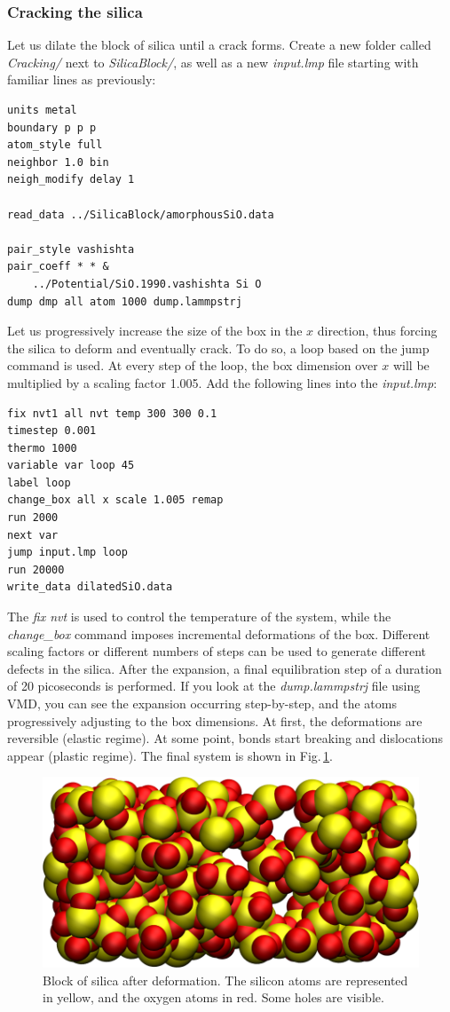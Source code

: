 \documentclass[9pt,tutorial]{livecoms}
\begin{document}
\subsubsection{Cracking the silica}
Let us dilate the block of silica until a crack forms. Create a new folder
called \textit{Cracking/} next to \textit{SilicaBlock/}, as well as a new
\textit{input.lmp} file starting with familiar lines as previously:
{\normalsize \begin{verbatim}
units metal
boundary p p p
atom_style full
neighbor 1.0 bin
neigh_modify delay 1

read_data ../SilicaBlock/amorphousSiO.data

pair_style vashishta
pair_coeff * * &
    ../Potential/SiO.1990.vashishta Si O
dump dmp all atom 1000 dump.lammpstrj
\end{verbatim}}
Let us progressively increase the size of the box in the $x$ direction, thus forcing
the silica to deform and eventually crack. To do so, a loop based on the jump command
is used. At every step of the loop, the box dimension over $x$ will be multiplied
by a scaling factor 1.005. Add the following lines into the \textit{input.lmp}:
{\normalsize \begin{verbatim}
fix nvt1 all nvt temp 300 300 0.1
timestep 0.001
thermo 1000
variable var loop 45
label loop
change_box all x scale 1.005 remap
run 2000
next var
jump input.lmp loop
run 20000
write_data dilatedSiO.data
\end{verbatim}}
The \textit{fix nvt} is used to control the temperature of the system, while the
\textit{change\_box} command imposes incremental deformations of the box. Different
scaling factors or different numbers of steps can be used to generate different
defects in the silica. After the expansion, a final equilibration step of a duration
of 20 picoseconds is performed. If you look at the \textit{dump.lammpstrj} file
using VMD, you can see the expansion occurring step-by-step, and the atoms
progressively adjusting to the box dimensions. At first, the deformations are
reversible (elastic regime). At some point, bonds start breaking and dislocations
appear (plastic regime). The final system is shown in Fig.\,\ref{fig:GCMC-cracked}.

\begin{figure}
\centering
\includegraphics[width=\linewidth]{GCMC-cracked}
\caption{Block of silica after deformation. The silicon atoms are represented in
yellow, and the oxygen atoms in red. Some holes are visible.}
\label{fig:GCMC-cracked}
\end{figure}
\end{document}
